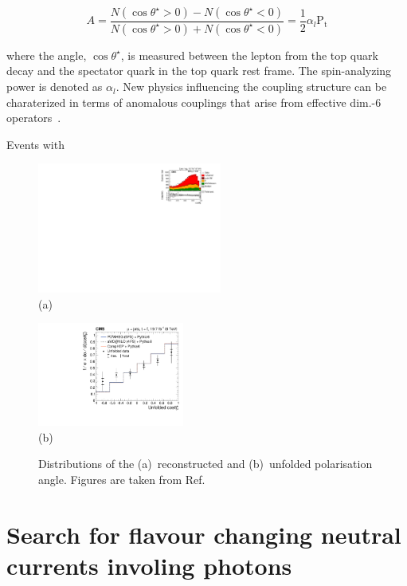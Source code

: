 \documentclass{PoS}
\begin{document}
\begin{equation}
A=\frac{N(\cos\theta^{\star}>0)-N(\cos\theta^{\star}<0)}{N(\cos\theta^{\star}>0)+N(\cos\theta^{\star}<0)}=\frac{1}{2}\alpha_{l}\mathrm{P_{t}}
\end{equation}

where the angle, $\cos\theta^{\star}$, is measured between the lepton from the top quark decay and the spectator quark in the top quark rest frame. The spin-analyzing power is denoted as $\alpha_{l}$. New physics influencing the coupling structure can be charaterized in terms of anomalous couplings that arise from effective dim.-6 operators~\cite{minimal-anom-set}.

Events with

\begin{figure}[htbp]
\begin{center}
\parbox[t]{0.55\textwidth}{\centering\includegraphics[width=0.54\textwidth]{figures/polarization/2j1t_cos_theta.pdf}\\(a)}
\parbox[t]{0.44\textwidth}{\centering\includegraphics[width=0.43\textwidth]{figures/polarization/cos_theta_unfolded.pdf}\\(b)}
\caption{Distributions of the (a)~reconstructed and (b)~unfolded polarisation angle. Figures are taken from Ref.~\cite{CMS-PAS-TOP-13-001}}
\end{center}
\end{figure}


\section{Search for flavour changing neutral currents involing photons}
\end{document}
